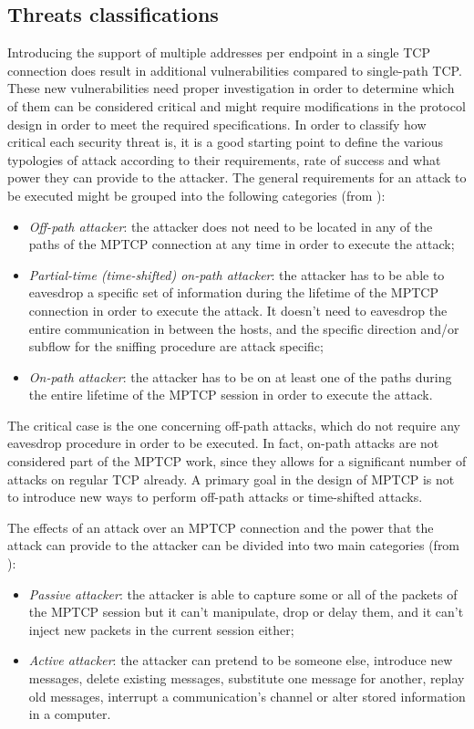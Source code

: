 \subsection{Threats classifications}
Introducing the support of multiple addresses per endpoint in a single TCP connection does result in additional vulnerabilities compared to single-path TCP. These new vulnerabilities need proper investigation in order to determine which of them can be considered critical and might require modifications in the protocol design in order to meet the required specifications. In order to classify how critical each security threat is, it is a good starting point to define the various typologies of attack according to their requirements, rate of success and what power they can provide to the attacker.
The general requirements for an attack to be executed might be grouped into the following categories (from ):

\begin{itemize}  
\item \textit{Off-path attacker}: the attacker does not need to be located in any of the paths of the MPTCP connection at any time in order to execute the attack;
\item \textit{Partial-time (time-shifted) on-path attacker}: the attacker has to be able to eavesdrop a specific set of information during the lifetime of the MPTCP connection in order to execute the attack. It doesn't need to eavesdrop the entire communication in between the hosts, and the specific direction and/or subflow for the sniffing procedure are attack specific;
\item \textit{On-path attacker}: the attacker has to be on at least one of the paths during the entire lifetime of the MPTCP session in order to execute the attack.
\end{itemize}

The critical case is the one concerning off-path attacks, which do not require any eavesdrop procedure in order to be executed. In fact, on-path attacks are not considered part of the MPTCP work, since they allows for a significant number of attacks on regular TCP already. A primary goal in the design of MPTCP is not to introduce new ways to perform off-path attacks or time-shifted attacks.

The effects of an attack over an MPTCP connection and the power that the attack can provide to the attacker can be divided into two main categories (from ):

\begin{itemize}  
\item \textit{Passive attacker}: the attacker is able to capture some or all of the packets of the MPTCP session but it can't manipulate, drop or delay them, and it can't inject new packets in the current session either;
\item \textit{Active attacker}: the attacker can pretend to be someone else, introduce new messages, delete existing messages, substitute one message for another, replay old messages, interrupt a communication's channel or alter stored information in a computer.
\end{itemize}

